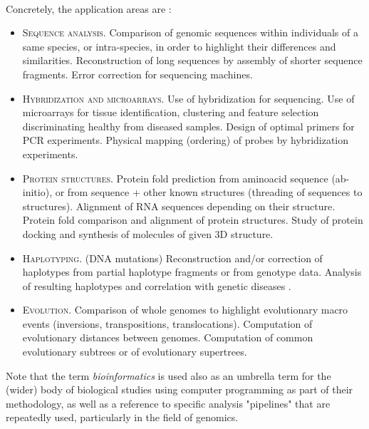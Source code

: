 \paragraph{}
Concretely, the application areas are \cite{a1020100}:
\begin{itemize}
	\item \textsc{Sequence analysis.} Comparison of genomic sequences within individuals of a same species, or intra-species, in order to highlight their differences and similarities. Reconstruction of long sequences by assembly of shorter sequence fragments. Error correction for sequencing machines.
	\item \textsc{Hybridization and microarrays.} Use of hybridization for sequencing. Use of microarrays for tissue identification, clustering and feature selection discriminating healthy from diseased samples. Design of optimal primers for PCR experiments. Physical mapping (ordering) of probes by hybridization experiments.
	\item \textsc{Protein structures.} Protein fold prediction from aminoacid sequence (ab-initio), or from sequence + other known structures (threading of sequences to structures). Alignment of RNA sequences depending on their structure. Protein fold comparison and alignment of protein structures. Study of protein docking and synthesis of molecules of given 3D structure.
	\item \textsc{Haplotyping.} (DNA mutations) Reconstruction and/or correction of haplotypes from partial haplotype fragments or from genotype data. Analysis of resulting haplotypes and correlation with genetic diseases \cite{Bonizzoni2003}.
	\item \textsc{Evolution.} Comparison of whole genomes to highlight evolutionary macro events (inversions, transpositions, translocations). Computation of evolutionary distances between genomes. Computation of common evolutionary subtrees or of evolutionary supertrees.
\end{itemize}

Note that the term \textit{bioinformatics} is used also as an umbrella term for the (wider) body of biological studies using computer programming as part of their methodology, as well as a reference to specific analysis "pipelines" that are repeatedly used, particularly in the field of genomics.